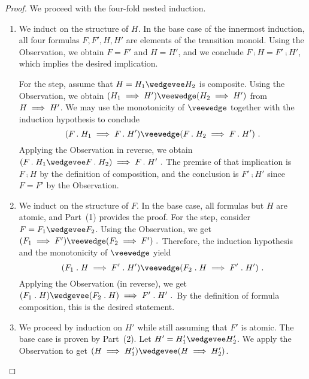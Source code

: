 \documentclass[../../diss.tex]{subfiles}
\begin{document}
\begin{proof}
    We proceed with the four-fold nested induction.

    \begin{enumerate}[(1)]
        \item
            We induct on the structure of $H$.
            In the base case of the innermost induction, all four formulas $F,F',H,H'$ are elements of the transition monoid.
            Using the  Observation, we obtain $F = F'$ and $H = H'$, and we conclude $F \comp H = F' \comp H'$, which implies the desired implication.

            For the step, assume that $H = H_1 \wedgevee H_2$ is composite.
            Using the  Observation, we obtain $(H_1 \lleq H') \veewedge (H_2 \lleq H')$ from $H \implies H'$.
            We may use the monotonicity of $\veewedge$ together with the induction hypothesis to conclude
            \[
                (F \comp H_1 \lleq F \comp H') \veewedge (F \comp H_2 \lleq F \comp H')
                \ .
            \]
            Applying the  Observation in reverse, we obtain
            \(
                (F \comp H_1 \wedgevee F \comp H_2) \lleq F \comp H'
                \ .
            \)
            The premise of that implication is $F \comp H$ by the definition of composition, and the conclusion is $F' \comp H'$ since $F = F'$ by the  Observation.
        \item
            We induct on the structure of $F$.
            In the base case, all formulas but $H$ are atomic, and Part~(1) provides the proof.
            For the step, consider $F = F_1 \wedgevee F_2$.
            Using the  Observation, we get
            \(
                (F_1 \lleq F') \veewedge (F_2 \lleq F')
                \ .
            \)
            Therefore, the induction hypothesis and the monotonicity of $\veewedge$ yield
            \[
                (F_1 \comp H \lleq F' \comp H') \veewedge (F_2 \comp H \lleq F' \comp H')
                \ .
            \]
            Applying the  Observation (in reverse), we get
            \(
                (F_1 \comp H) \wedgevee (F_2 \comp H) \lleq F' \comp H'
                \ .
            \)
            By the definition of formula composition, this is the desired statement.
        \item
            We proceed by induction on $H'$ while still assuming that $F'$ is atomic.
            The base case is proven by Part~(2).
            Let $H' = H_1' \wedgevee H_2'$.
            We apply the  Observation to get $(H \lleq H_1') \wedgevee (H \lleq H_2')$.

\end{enumerate}
\end{proof}
\end{document}
